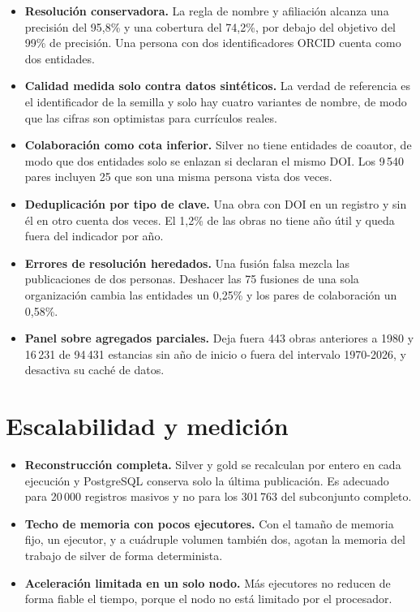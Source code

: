 \begin{itemize}
  \item \textbf{Resolución conservadora.} La regla de nombre y afiliación
  alcanza una precisión del 95,8\% y una cobertura del 74,2\%, por debajo del
  objetivo del 99\% de precisión. Una persona con dos identificadores ORCID
  cuenta como dos entidades.
  \item \textbf{Calidad medida solo contra datos sintéticos.} La verdad de
  referencia es el identificador de la semilla y solo hay cuatro variantes de
  nombre, de modo que las cifras son optimistas para currículos reales.
  \item \textbf{Colaboración como cota inferior.} Silver no tiene entidades
  de coautor, de modo que dos entidades solo se enlazan si declaran el mismo
  DOI. Los 9\,540 pares incluyen 25 que son una misma persona vista dos
  veces.
  \item \textbf{Deduplicación por tipo de clave.} Una obra con DOI en un
  registro y sin él en otro cuenta dos veces. El 1,2\% de las obras no tiene
  año útil y queda fuera del indicador por año.
  \item \textbf{Errores de resolución heredados.} Una fusión falsa mezcla las
  publicaciones de dos personas. Deshacer las 75 fusiones de una sola
  organización cambia las entidades un 0,25\% y los pares de colaboración un
  0,58\%.
  \item \textbf{Panel sobre agregados parciales.} Deja fuera 443 obras
  anteriores a 1980 y 16\,231 de 94\,431 estancias sin año de inicio o fuera
  del intervalo 1970-2026, y desactiva su caché de datos.
\end{itemize}

\section{Escalabilidad y medición}
\label{sec:anexo_limitaciones_escala}

\begin{itemize}
  \item \textbf{Reconstrucción completa.} Silver y gold se recalculan por
  entero en cada ejecución y PostgreSQL conserva solo la última publicación.
  Es adecuado para 20\,000 registros masivos y no para los 301\,763 del
  subconjunto completo.
  \item \textbf{Techo de memoria con pocos ejecutores.} Con el tamaño de
  memoria fijo, un ejecutor, y a cuádruple volumen también dos, agotan la
  memoria del trabajo de silver de forma determinista.
  \item \textbf{Aceleración limitada en un solo nodo.} Más ejecutores no
  reducen de forma fiable el tiempo, porque el nodo no está limitado por el
  procesador.
\end{itemize}
